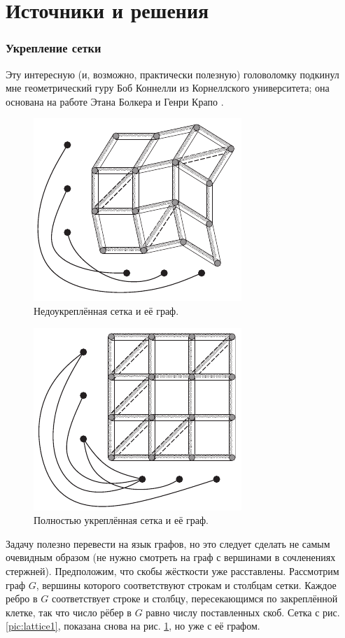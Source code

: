 \section*{Источники и решения}

\subsubsection*{Укрепление сетки}

Эту интересную (и, возможно, практически полезную) головоломку подкинул мне геометрический гуру Боб Коннелли из Корнеллского университета; она основана на работе Этана Болкера и Генри Крапо \cite{8}.


\begin{figure}[ht!]
\centering
\includegraphics[scale=1]{pics/lattice2}
\caption{Недоукреплённая сетка и её граф.}
\label{pic:lattice2}
\end{figure}

\begin{figure}[t!]
\centering
\includegraphics[scale=1]{pics/lattice3}
\caption{Полностью укреплённая сетка и её граф.}
\label{pic:lattice3}
\end{figure}

Задачу полезно перевести на язык графов, но это следует сделать не самым очевидным образом (не нужно смотреть на граф с вершинами в сочленениях стержней).
Предположим, что скобы жёсткости уже расставлены.
Рассмотрим граф $G$, вершины которого соответствуют строкам и столбцам сетки.
Каждое ребро в $G$ соответствует строке и столбцу, пересекающимся по закреплённой клетке, так что число рёбер в $G$ равно числу поставленных скоб.
Сетка с рис. \ref{pic:lattice1}, показана снова на рис. \ref{pic:lattice2}, но уже с её графом.

